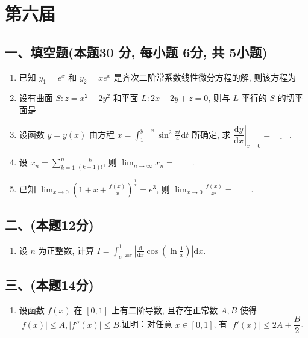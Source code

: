 \newpage
\section{第六届}

\subsection*{一、填空题(本题30 分,  每小题 6分,  共 5小题)}
\begin{enumerate}
    \item 已知 $y_1 = e^x$ 和 $y_2 = xe^x$ 是齐次二阶常系数线性微分方程的解,  则该方程为
    \item 设有曲面 $S: z = x^2 + 2y^2$ 和平面 $L: 2x + 2y + z = 0$,  则与 $L$ 平行的 $S$ 的切平面是
    \item 设函数 $y = y(x)$ 由方程 $x = \displaystyle\int_1^{y-x} \sin^2 \frac{\pi t}{4}  \mathrm{d}t$ 所确定,  求 $\left. \dfrac{\mathrm{d}y}{\mathrm{d}x} \right|_{x=0} = \underline{\quad\quad}$.
    \item 设 $x_n = \displaystyle\sum_{k=1}^{n} \frac{k}{(k+1)!}$,  则 $\displaystyle\lim_{n \to \infty} x_n = \underline{\quad\quad}$.
    \item 已知 $\displaystyle\lim_{x \to 0} \left(1 + x + \frac{f(x)}{x}\right)^{\frac{1}{x}} = e^3$,  则 $\displaystyle\lim_{x \to 0} \frac{f(x)}{x^2} = \underline{\quad\quad}$.
\end{enumerate}

\subsection*{二、(本题12分)}
\begin{enumerate}[start=6]
    \item 设 $n$ 为正整数,  计算 $I = \displaystyle\int_{e^{-2n\pi}}^1 \left| \frac{\mathrm{d}}{\mathrm{d}x} \cos \left( \ln \frac{1}{x} \right) \right| \mathrm{d}x$.
\end{enumerate}

\subsection*{三、(本题14分)}
\begin{enumerate}[start=7]
    \item 设函数 $f(x)$ 在 $[0, 1]$ 上有二阶导数,  且存在正常数 $A,  B$ 使得 $|f(x)| \leqslant A,  |f''(x)| \leqslant B$.证明：对任意 $x \in [0, 1]$,  有 $|f'(x)| \leqslant 2A + \dfrac{B}{2}$.
\end{enumerate}

